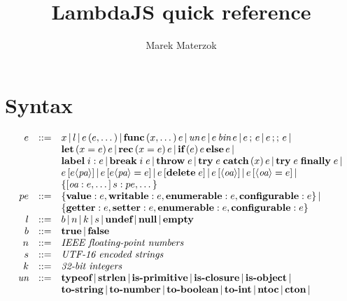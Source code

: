 \documentclass[draft, 10pt]{article}
\title{LambdaJS quick reference}
\author{Marek Materzok}
\newcommand{\expr}[0]{e}
\newcommand{\var}[0]{x}
\newcommand{\lit}[0]{l}
\newcommand{\bool}[0]{b}
\newcommand{\num}[0]{n}
\newcommand{\intg}[0]{k}
\newcommand{\str}[0]{s}
\newcommand{\id}[0]{i}
\newcommand{\eprop}[0]{pe}
\newcommand{\undef}[0]{\textbf{undef}}
\newcommand{\nul}[0]{\textbf{null}}
\newcommand{\empt}[0]{\textbf{empty}}
\newcommand{\true}[0]{\textbf{true}}
\newcommand{\false}[0]{\textbf{false}}
\newcommand{\unop}[0]{\textit{un}}
\newcommand{\binop}[0]{\textit{bin}}
\newcommand{\pattr}[0]{\textit{pa}}
\newcommand{\oattr}[0]{\textit{oa}}
\newcommand{\pavalue}[0]{\textbf{value}}
\newcommand{\pawritable}[0]{\textbf{writable}}
\newcommand{\paget}[0]{\textbf{getter}}
\newcommand{\paset}[0]{\textbf{setter}}
\newcommand{\paenum}[0]{\textbf{enumerable}}
\newcommand{\paconfig}[0]{\textbf{configurable}}
\newcommand{\unap}[1]{\unop \thinspace #1}
\newcommand{\binap}[2]{#1 \thinspace \binop \thinspace #2}
\newcommand{\ap}[2]{#1\thinspace(#2)}
\newcommand{\func}[2]{\textbf{func}\thinspace(#1)\thinspace #2}
\newcommand{\seq}[2]{#1 \thinspace ; \thinspace #2}
\newcommand{\jseq}[2]{#1 \thinspace ;; \thinspace #2}
\newcommand{\letdef}[3]{\textbf{let} \thinspace (#1 = #2) \thinspace #3}
\newcommand{\recdef}[3]{\textbf{rec} \thinspace (#1 = #2) \thinspace #3}
\newcommand{\ife}[3]{\textbf{if} \thinspace (#1) \thinspace #2 \thinspace \textbf{else} \thinspace #3}
\newcommand{\lbl}[2]{\textbf{label} \thickspace #1: #2}
\newcommand{\brk}[2]{\textbf{break} \thickspace #1 \thickspace #2}
\newcommand{\throw}[1]{\textbf{throw} \thickspace #1}
\newcommand{\trycatch}[3]{\textbf{try} \thickspace #1 \thickspace \textbf{catch}\thinspace(#2) \thinspace #3}
\newcommand{\tryfin}[2]{\textbf{try} \thickspace #1 \thickspace \textbf{finally} \thickspace #2}
\newcommand{\getattr}[3]{#2 \thinspace [ #3 \langle #1 \rangle ] }
\newcommand{\setattr}[4]{#2 \thinspace [ #3 \langle #1 \rangle = #4 ] }
\newcommand{\delattr}[2]{#1 \thinspace [ \textbf{delete} \thickspace #2 ]}
\newcommand{\getoattr}[2]{#2 \thinspace [ \langle #1 \rangle ]}
\newcommand{\setoattr}[3]{#2 \thinspace [ \langle #1 \rangle = #3 ]}
\newcommand{\bnfsep}[0]{\thinspace | \thinspace}
\newcommand{\optypeof}[0]{\textbf{typeof}}
\newcommand{\opstrlen}[0]{\textbf{strlen}}
\newcommand{\opisprim}[0]{\textbf{is-primitive}}
\newcommand{\opisclosure}[0]{\textbf{is-closure}}
\newcommand{\opisobject}[0]{\textbf{is-object}}
\newcommand{\optostr}[0]{\textbf{to-string}}
\newcommand{\optonum}[0]{\textbf{to-number}}
\newcommand{\optobool}[0]{\textbf{to-boolean}}
\newcommand{\optoint}[0]{\textbf{to-int}}
\newcommand{\opntoc}[0]{\textbf{ntoc}}
\newcommand{\opcton}[0]{\textbf{cton}}
\begin{document}
\maketitle

\section{Syntax}

\[
\begin{array}{rcl}
\expr & ::= & \var \bnfsep \lit \bnfsep \ap{\expr}{\expr, \dots} \bnfsep
              \func{\var, \dots}{\expr} \bnfsep
              \unap{\expr} \bnfsep \binap{\expr}{\expr} \bnfsep
              \seq{\expr}{\expr} \bnfsep \jseq{\expr}{\expr} \bnfsep \\
          & & \letdef{\var}{\expr}{\expr} \bnfsep \recdef{\var}{\expr}{\expr} \bnfsep
              \ife{\expr}{\expr}{\expr} \bnfsep \\
          & & \lbl{\id}{\expr} \bnfsep \brk{\id}{\expr} \bnfsep
              \throw{\expr} \bnfsep \trycatch{\expr}{\var}{\expr} \bnfsep \tryfin{\expr}{\expr} \bnfsep \\
          & & \getattr{\pattr}{\expr}{\expr} \bnfsep \setattr{\pattr}{\expr}{\expr}{\expr} \bnfsep
              \delattr{\expr}{\expr} \bnfsep \getoattr{\oattr}{\expr} \bnfsep 
              \setoattr{\oattr}{\expr}{\expr} \bnfsep \\
          & & \{[\oattr: \expr, \dots] \thinspace \str : \eprop, \dots \} \\
\eprop & ::= & \{\pavalue : \expr, \pawritable : \expr, \paenum : \expr, \paconfig : \expr \} \bnfsep \\
           & & \{\paget : \expr, \paset : \expr, \paenum : \expr, \paconfig : \expr \} \\
\lit & ::= & \bool \bnfsep \num \bnfsep \intg \bnfsep \str \bnfsep \undef \bnfsep \nul \bnfsep \empt \\
\bool & ::= & \true \bnfsep \false \\
\num & ::= & \textit{IEEE floating-point numbers} \\
\str & ::= & \textit{UTF-16 encoded strings} \\
\intg & ::= & \textit{32-bit integers} \\
\unop & ::= & \optypeof \bnfsep \opstrlen \bnfsep \opisprim \bnfsep \opisclosure \bnfsep \opisobject \bnfsep \\
      && \optostr \bnfsep \optonum \bnfsep \optobool \bnfsep \optoint \bnfsep \opntoc \bnfsep \opcton \bnfsep \\

\end{array}\]
\end{document}
